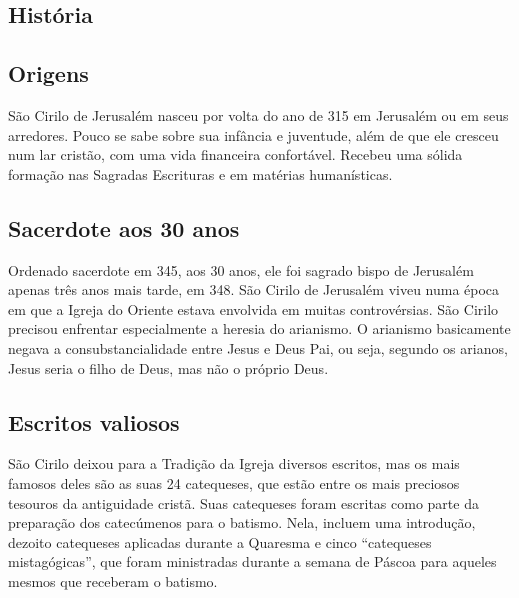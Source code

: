 \documentclass[18pt]{article}
\begin{document}
\begin{justify}
 \section{História}


 \begin{justify}
  \subsection{Origens}
 \end{justify}

São Cirilo de Jerusalém nasceu por volta do ano de 315 em Jerusalém ou em seus arredores. Pouco se sabe sobre sua infância e juventude, além de que ele cresceu num lar cristão, com uma vida financeira confortável. Recebeu uma sólida formação nas Sagradas Escrituras e em matérias humanísticas.

 \begin{justify}
  \subsection{Sacerdote aos 30 anos}
 \end{justify}

Ordenado sacerdote em 345, aos 30 anos, ele foi sagrado bispo de Jerusalém apenas três anos mais tarde, em 348. São Cirilo de Jerusalém viveu numa época em que a Igreja do Oriente estava envolvida em muitas controvérsias.  São Cirilo precisou enfrentar especialmente a heresia do arianismo. O arianismo basicamente negava a consubstancialidade entre Jesus e Deus Pai, ou seja, segundo os arianos, Jesus seria o filho de Deus, mas não o próprio Deus.

 \begin{justify}
  \subsection{Escritos valiosos}
 \end{justify}

São Cirilo deixou para a Tradição da Igreja diversos escritos, mas os mais famosos deles são as suas 24 catequeses, que estão entre os mais preciosos tesouros da antiguidade cristã. Suas catequeses foram escritas como parte da preparação dos catecúmenos para o batismo. Nela, incluem uma introdução, dezoito catequeses aplicadas durante a Quaresma e cinco “catequeses mistagógicas”, que foram ministradas durante a semana de Páscoa para aqueles mesmos que receberam o batismo.


\end{justify}
\end{document}
